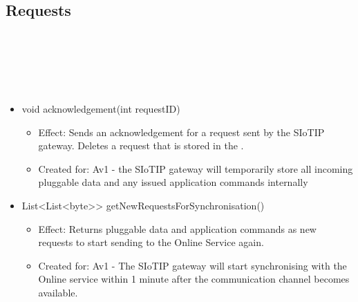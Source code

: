   \subsection{Requests}\label{int:GatewayGatewayOnlineServiceBrokerRequestStoreRequests}
    \begin{description}
      \item[Provided by:] \iconcomponent{}~
      \item[Required by:] \iconcomponent{}~
      \item[Operations:] ~
    \begin{itemize}[noitemsep,nolistsep,leftmargin=-.25cm]
      \item \textsf{void acknowledgement(int requestID)}
        \begin{itemize}[noitemsep,nolistsep]
           \item Effect: Sends an acknowledgement for a request sent by the SIoTIP gateway. Deletes a request that is stored in the .
\item Created for: Av1 - the SIoTIP gateway will temporarily store all incoming pluggable data and any issued application commands internally
        \end{itemize}
      \item \textsf{List\textless{}List\textless{}byte\textgreater{}\textgreater{} getNewRequestsForSynchronisation()}
        \begin{itemize}[noitemsep,nolistsep]
           \item Effect: Returns pluggable data and application commands as new requests to start sending to the Online Service again.
\item Created for: Av1 - The SIoTIP gateway will start synchronising with the Online service within 1 minute after the communication channel becomes available.
        \end{itemize}
    \end{itemize}
    \end{description}

